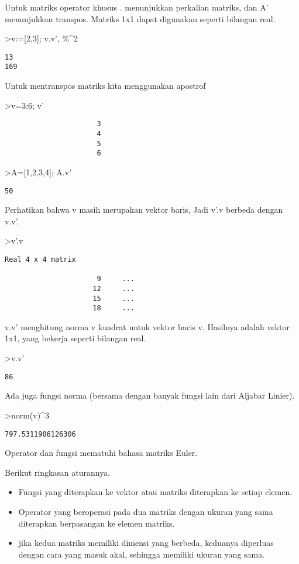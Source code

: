 \documentclass[
]{book}
\begin{document}
Untuk matriks operator khusus . menunjukkan perkalian matriks, dan A' menunjukkan transpos. Matriks 1x1 dapat digunakan seperti bilangan real.

\textgreater v:={[}2,3{]}; v.v', \%\^{}2

\begin{verbatim}
13
169
\end{verbatim}

Untuk mentranspos matriks kita menggunakan apostrof

\textgreater v=3:6; v'

\begin{verbatim}
                      3 
                      4 
                      5 
                      6 
\end{verbatim}

\textgreater A={[}1,2,3,4{]}; A.v'

\begin{verbatim}
50
\end{verbatim}

Perhatikan bahwa v masih merupakan vektor baris, Jadi v'.v berbeda dengan v.v'.

\textgreater v'.v

\begin{verbatim}
Real 4 x 4 matrix

                      9     ...
                     12     ...
                     15     ...
                     18     ...
\end{verbatim}

v.v' menghitung norma v kuadrat untuk vektor baris v. Hasilnya adalah vektor 1x1, yang bekerja seperti bilangan real.

\textgreater v.v'

\begin{verbatim}
86
\end{verbatim}

Ada juga fungsi norma (bersama dengan banyak fungsi lain dari Aljabar Linier).

\textgreater norm(v)\^{}3

\begin{verbatim}
797.5311906126306
\end{verbatim}

Operator dan fungsi mematuhi bahasa matriks Euler.

Berikut ringkasan aturannya.

\begin{itemize}
\item
  Fungsi yang diterapkan ke vektor atau matriks diterapkan ke setiap elemen.
\item
  Operator yang beroperasi pada dua matriks dengan ukuran yang sama diterapkan berpasangan ke elemen matriks.
\item
  jika kedua matriks memiliki dimensi yang berbeda, keduanya diperluas dengan cara yang masuk akal, sehingga memiliki ukuran yang sama.
\end{itemize}
\end{document}
